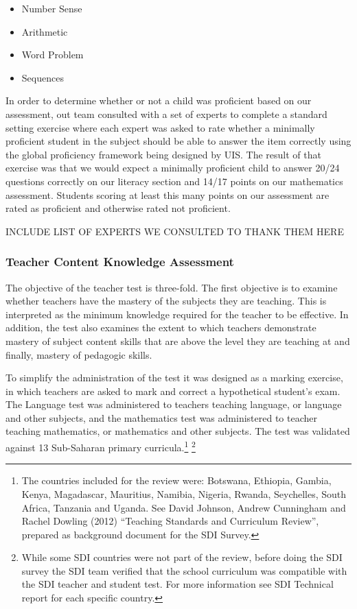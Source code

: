 \documentclass[]{article}
\providecommand{\tightlist}{%
  \setlength{\itemsep}{0pt}\setlength{\parskip}{0pt}}
\let\rmarkdownfootnote\footnote%
\def\footnote{\protect\rmarkdownfootnote}
\begin{document}
\begin{itemize}
\tightlist
\item
  Number Sense
\item
  Arithmetic
\item
  Word Problem
\item
  Sequences
\end{itemize}

In order to determine whether or not a child was proficient based on our
assessment, out team consulted with a set of experts to complete a
standard setting exercise where each expert was asked to rate whether a
minimally proficient student in the subject should be able to answer the
item correctly using the global proficiency framework being designed by
UIS. The result of that exercise was that we would expect a minimally
proficient child to answer 20/24 questions correctly on our literacy
section and 14/17 points on our mathematics assessment. Students scoring
at least this many points on our assessment are rated as proficient and
otherwise rated not proficient.

INCLUDE LIST OF EXPERTS WE CONSULTED TO THANK THEM HERE

\hypertarget{teacher-content-knowledge-assessment}{%
\subsubsection{Teacher Content Knowledge
Assessment}\label{teacher-content-knowledge-assessment}}

The objective of the teacher test is three-fold. The first objective is
to examine whether teachers have the mastery of the subjects they are
teaching. This is interpreted as the minimum knowledge required for the
teacher to be effective. In addition, the test also examines the extent
to which teachers demonstrate mastery of subject content skills that are
above the level they are teaching at and finally, mastery of pedagogic
skills.

To simplify the administration of the test it was designed as a marking
exercise, in which teachers are asked to mark and correct a hypothetical
student's exam. The Language test was administered to teachers teaching
language, or language and other subjects, and the mathematics test was
administered to teacher teaching mathematics, or mathematics and other
subjects. The test was validated against 13 Sub-Saharan primary
curricula.\footnote{The countries included for the review were:
  Botswana, Ethiopia, Gambia, Kenya, Magadascar, Mauritius, Namibia,
  Nigeria, Rwanda, Seychelles, South Africa, Tanzania and Uganda. See
  David Johnson, Andrew Cunningham and Rachel Dowling (2012) ``Teaching
  Standards and Curriculum Review'', prepared as background document for
  the SDI Survey.} \footnote{While some SDI countries were not part of
  the review, before doing the SDI survey the SDI team verified that the
  school curriculum was compatible with the SDI teacher and student
  test. For more information see SDI Technical report for each specific
  country.}
\end{document}
